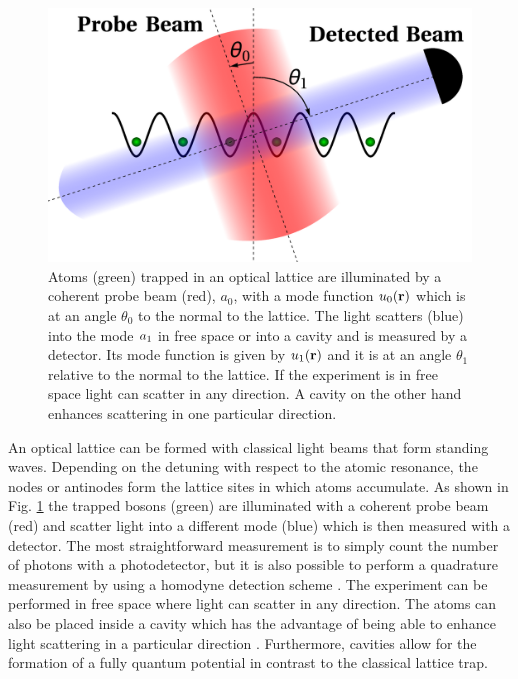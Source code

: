 \begin{figure}
  \centering
  \includegraphics[width=\linewidth]{LatticeDiagram}
  \caption[Experimental Setup in Free Space]{Atoms (green) trapped in
    an optical lattice are illuminated by a coherent probe beam (red),
    $a_0$, with a mode function $u_0(\mathbf{r})$ which is at an angle
    $\theta_0$ to the normal to the lattice. The light scatters (blue)
    into the mode $a_1$ in free space or into a cavity and is
    measured by a detector. Its mode function is given by $u_1(\mathbf{r})$
    and it is at an angle $\theta_1$ relative to the normal to the
    lattice. If the experiment is in free space light can scatter in
    any direction. A cavity on the other hand enhances scattering in
    one particular direction.}
  \label{fig:LatticeDiagram}
\end{figure}

An optical lattice can be formed with classical light beams that form
standing waves. Depending on the detuning with respect to the atomic
resonance, the nodes or antinodes form the lattice sites in which
atoms accumulate. As shown in Fig. \ref{fig:LatticeDiagram} the
trapped bosons (green) are illuminated with a coherent probe beam
(red) and scatter light into a different mode (blue) which is then
measured with a detector. The most straightforward measurement is to
simply count the number of photons with a photodetector, but it is
also possible to perform a quadrature measurement by using a homodyne
detection scheme \cite{carmichael, atoms2015}. The experiment can be
performed in free space where light can scatter in any direction. The
atoms can also be placed inside a cavity which has the advantage of
being able to enhance light scattering in a particular direction
\cite{bux2013, kessler2014, landig2015}. Furthermore, cavities allow
for the formation of a fully quantum potential in contrast to the
classical lattice trap.

